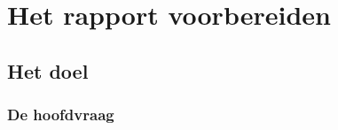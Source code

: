 \section{Het rapport voorbereiden}


\subsection{Het doel}
\subsubsection{De hoofdvraag}
\subsubsection{}


